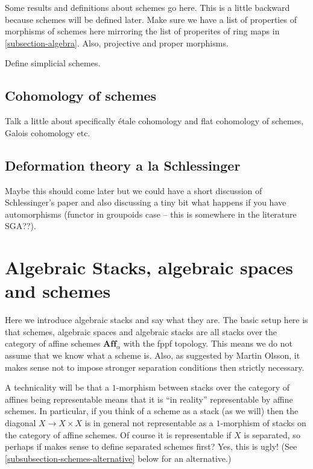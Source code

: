 \noindent
Some results and definitions about schemes go here. This is a little backward
because schemes will be defined later. Make sure we have a list of properties
of morphisms of schemes here mirroring the list of properites of ring maps
in \autoref{subsection-algebra}. Also, projective and proper morphisms.

\smallskip\noindent
Define simplicial schemes.

\subsection{Cohomology of schemes}
\label{subsection-schemes-cohomology}

\noindent
Talk a little about specifically \'etale cohomology and flat cohomology
of schemes, Galois cohomology etc.

\subsection{Deformation theory a la Schlessinger}
\label{subsection-deformation-schlessinger}

\noindent
Maybe this should come later but we could have a short discussion of 
Schlessinger's paper and also discussing a tiny bit what happens if 
you have automorphisms (functor in groupoids case -- this is somewhere
in the literature SGA??).

\section{Algebraic Stacks, algebraic spaces and schemes}
\label{section-algebraic-stacks}

\noindent
Here we introduce algebraic stacks and say what they are. The basic setup
here is that schemes, algebraic spaces and algebraic stacks are all
stacks over the category of affine schemes $\textbf{Aff}_\alpha$ with
the fppf topology. This means we do not assume that we know what a scheme
is. Also, as suggested by Martin Olsson, it makes sense not to impose 
stronger separation conditions then strictly necessary.

\smallskip\noindent
A technicality will be that a $1$-morphism between stacks over the category
of affines being representable means that it is ``in reality'' representable
by affine schemes. In particular, if you think of a scheme as a stack (as we
will) then the diagonal $X \to X\times X$ is in general not representable as
a $1$-morphism of stacks on the category of affine schemes. Of course it is
representable if $X$ is separated, so perhaps if makes sense to define 
separated schemes first? Yes, this is ugly! (See 
\autoref{subsubsection-schemes-alternative} below for an alternative.)

